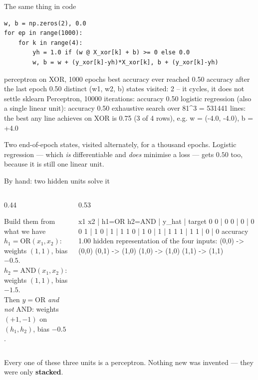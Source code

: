 \documentclass[aspectratio=169]{beamer}
\begin{document}
\begin{frame}[fragile,shrink=6]{The same thing in code}
\begin{lstlisting}
w, b = np.zeros(2), 0.0
for ep in range(1000):
    for k in range(4):
        yh = 1.0 if (w @ X_xor[k] + b) >= 0 else 0.0
        w, b = w + (y_xor[k]-yh)*X_xor[k], b + (y_xor[k]-yh)
\end{lstlisting}
\begin{outblk}
perceptron on XOR, 1000 epochs
   best accuracy ever reached      0.50
   accuracy after the last epoch   0.50
   distinct (w1, w2, b) states visited: 2 -- it cycles, it does not settle
   sklearn Perceptron, 10000 iterations: accuracy 0.50
   logistic regression (also a single linear unit): accuracy 0.50
   exhaustive search over 81^3 = 531441 lines: the best any line achieves
   on XOR is 0.75 (3 of 4 rows), e.g. w = (-4.0, -4.0), b = +4.0
\end{outblk}
  \begin{center}\small
    Two end-of-epoch states, visited alternately, for a thousand epochs.
    Logistic regression --- which \emph{is} differentiable and \emph{does}
    minimise a loss --- gets $0.50$ too, because it is still one linear unit.
  \end{center}
\end{frame}

\begin{frame}[fragile,shrink=8]{By hand: two hidden units solve it}
  \begin{columns}[T]
    \begin{column}{0.44\textwidth}
      \begin{block}{Build them from what we have}
        $h_1 = \mathrm{OR}(x_1,x_2)$: weights $(1,1)$, bias $-0.5$.\\
        $h_2 = \mathrm{AND}(x_1,x_2)$: weights $(1,1)$, bias $-1.5$.\\[0.3em]
        Then $\hat y = \mathrm{OR}$ \emph{and not} $\mathrm{AND}$: weights
        $(+1, -1)$ on $(h_1, h_2)$, bias $-0.5$.
      \end{block}
    \end{column}
    \begin{column}{0.53\textwidth}
\begin{outblk}
 x1 x2 | h1=OR h2=AND | y_hat | target
  0  0  |   0     0    |   0   |   0
  0  1  |   1     0    |   1   |   1
  1  0  |   1     0    |   1   |   1
  1  1  |   1     1    |   0   |   0
accuracy 1.00
hidden representation of the four inputs:
   (0,0) -> (0,0)
   (0,1) -> (1,0)
   (1,0) -> (1,0)
   (1,1) -> (1,1)
\end{outblk}
    \end{column}
  \end{columns}
  \vspace{0.2em}
  \begin{center}\small
    Every one of these three units is a perceptron. Nothing new was invented
    --- they were only \textbf{stacked}.
  \end{center}
\end{frame}
\end{document}

